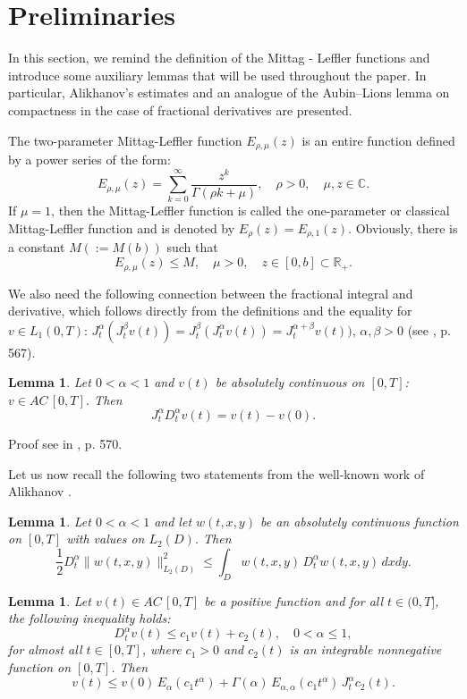 \documentclass[12pt]{amsart}
\newtheorem{lem}[thm]{Lemma}
\theoremstyle{definition}
\numberwithin{equation}{section}
\begin{document}
\section{Preliminaries}
In this section, we remind the definition of the Mittag - Leffler functions and introduce some auxiliary lemmas that will be used throughout the paper. In particular, Alikhanov's estimates and an analogue of the Aubin–Lions lemma on compactness in the case of fractional derivatives are presented.

 The two-parameter Mittag-Leffler function $E_{\rho,\mu}(z)$ is an entire function defined by a power series of the form:
$$
E_{\rho,\mu}(z)= \sum\limits_{k=0}^\infty \frac{z^k}{\Gamma(\rho
k+\mu)},\quad \rho>0, \quad \mu, z\in \mathbb{C}.
$$
If \(\mu = 1\), then the Mittag-Leffler function is called the one-parameter or classical Mittag-Leffler function and is denoted by \(E_{\rho}(z) = E_{\rho,1}(z)\). Obviously, there is a constant $M (:=M(b))$ such that
\begin{equation}\label{E}
   E_{\rho,\mu}(z) \leq M,  \quad \mu>0, \quad z\in [0,b]\subset \mathbb{R}_+. 
\end{equation}

We also need the following connection between the fractional integral and derivative, which follows directly from the definitions and the equality for $v\in L_1(0,T)$: $J^\alpha_t(J^\beta_t v(t))= J^\beta_t(J^\alpha_t v(t))=J^{\alpha+\beta}_t v(t))$, $\alpha, \beta >0$ (see \cite{Dzh66}, p. 567).
\begin{lem}\label{J} Let $0<\alpha<1$ and $v(t)$ be absolutely continuous on $[0,T]$: $v\in AC\,[0,T]$. Then
\begin{equation}\label{JD}
    J_t^\alpha D^\alpha_t v(t)= v(t)- v(0).
\end{equation}
    
\end{lem}
Proof see in \cite{Dzh66}, p. 570.

Let us now recall the following two statements from the well-known work of Alikhanov \cite{Alixan}.
\begin{lem}\label{Alixan1}
Let $0<\alpha<1$ and  let  $w(t,x, y)$ be an absolutely continuous function on $[0,T]$ with values on $L_2(D)$. Then
\[
\frac{1}{2} D_t^\alpha \| w(t,x, y) \|_{L_2(D)}^2 \leq \int_D w(t,x, y) \, D_t^\alpha w(t,x, y) \, dx dy.
\]
\end{lem}

\begin{lem}\label{Alixan2L}
Let \( v(t)\in AC\, [0,T] \) be a positive function and for all \( t \in (0,T] \), the following inequality holds:
\[
D_t^\alpha v(t) \leq c_1 v(t) + c_2(t), \quad 0<\alpha\leq 1,
\]
for almost all $t\in [0,T]$, where \( c_1>0 \) and \( c_2(t) \) is an integrable nonnegative function on $[0,T]$. Then
\begin{equation}\label{Alixan2}
v(t)\leq v(0) \,E_\alpha(c_1 t^\alpha) + \Gamma(\alpha) \,E_{\alpha, \alpha}(c_1 t^\alpha) \, J_t^\alpha c_2(t).
    \end{equation}
\end{lem}
\end{document}
